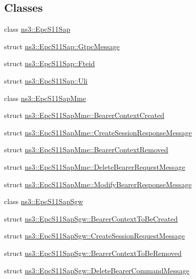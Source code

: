 \subsection*{Classes}
\begin{DoxyCompactItemize}
\item 
class \hyperlink{classns3_1_1EpcS11Sap}{ns3\+::\+Epc\+S11\+Sap}
\item 
struct \hyperlink{structns3_1_1EpcS11Sap_1_1GtpcMessage}{ns3\+::\+Epc\+S11\+Sap\+::\+Gtpc\+Message}
\item 
struct \hyperlink{structns3_1_1EpcS11Sap_1_1Fteid}{ns3\+::\+Epc\+S11\+Sap\+::\+Fteid}
\item 
struct \hyperlink{structns3_1_1EpcS11Sap_1_1Uli}{ns3\+::\+Epc\+S11\+Sap\+::\+Uli}
\item 
class \hyperlink{classns3_1_1EpcS11SapMme}{ns3\+::\+Epc\+S11\+Sap\+Mme}
\item 
struct \hyperlink{structns3_1_1EpcS11SapMme_1_1BearerContextCreated}{ns3\+::\+Epc\+S11\+Sap\+Mme\+::\+Bearer\+Context\+Created}
\item 
struct \hyperlink{structns3_1_1EpcS11SapMme_1_1CreateSessionResponseMessage}{ns3\+::\+Epc\+S11\+Sap\+Mme\+::\+Create\+Session\+Response\+Message}
\item 
struct \hyperlink{structns3_1_1EpcS11SapMme_1_1BearerContextRemoved}{ns3\+::\+Epc\+S11\+Sap\+Mme\+::\+Bearer\+Context\+Removed}
\item 
struct \hyperlink{structns3_1_1EpcS11SapMme_1_1DeleteBearerRequestMessage}{ns3\+::\+Epc\+S11\+Sap\+Mme\+::\+Delete\+Bearer\+Request\+Message}
\item 
struct \hyperlink{structns3_1_1EpcS11SapMme_1_1ModifyBearerResponseMessage}{ns3\+::\+Epc\+S11\+Sap\+Mme\+::\+Modify\+Bearer\+Response\+Message}
\item 
class \hyperlink{classns3_1_1EpcS11SapSgw}{ns3\+::\+Epc\+S11\+Sap\+Sgw}
\item 
struct \hyperlink{structns3_1_1EpcS11SapSgw_1_1BearerContextToBeCreated}{ns3\+::\+Epc\+S11\+Sap\+Sgw\+::\+Bearer\+Context\+To\+Be\+Created}
\item 
struct \hyperlink{structns3_1_1EpcS11SapSgw_1_1CreateSessionRequestMessage}{ns3\+::\+Epc\+S11\+Sap\+Sgw\+::\+Create\+Session\+Request\+Message}
\item 
struct \hyperlink{structns3_1_1EpcS11SapSgw_1_1BearerContextToBeRemoved}{ns3\+::\+Epc\+S11\+Sap\+Sgw\+::\+Bearer\+Context\+To\+Be\+Removed}
\item 
struct \hyperlink{structns3_1_1EpcS11SapSgw_1_1DeleteBearerCommandMessage}{ns3\+::\+Epc\+S11\+Sap\+Sgw\+::\+Delete\+Bearer\+Command\+Message}

\end{DoxyCompactItemize}
